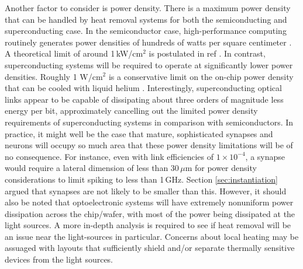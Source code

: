 \documentclass[twocolumn]{article}
\begin{document}
Another factor to consider is power density. There is a maximum power density that can be handled by heat removal systems for both the semiconducting and superconducting case. In the semiconductor case, high-performance computing routinely generates power densities of hundreds of watts per square centimeter \cite{tolpygo2016superconductor}. A theoretical limit of around 1\,kW/cm$^2$ is postulated in ref \cite{zhirnov2003limits}. In contrast, superconducting systems will be required to operate at significantly lower power densities. Roughly 1 W/cm$^2$ is a conservative limit on the on-chip power density that can be cooled with liquid helium \cite{tolpygo2016superconductor}. Interestingly, superconducting optical links appear to be capable of dissipating about three orders of magnitude less energy per bit, approximately cancelling out the limited power density requirements of superconducting systems in comparison with semiconductors. In practice, it might well be the case that mature, sophisticated synapses and neurons will occupy so much area that these power density limitations will be of no consequence. For instance, even with link efficiencies of $1 \times 10^{-4}$, a synapse would require a lateral dimension of less than 30\,$\mu$m for power density considerations to limit spiking to less than 1\,GHz. Section \ref{sec:instantiation} argued that synapses are not likely to be smaller than this. However, it should also be noted that optoelectronic systems will have extremely nonuniform power dissipation across the chip/wafer, with most of the power being dissipated at the light sources. A more in-depth analysis is required to see if heat removal will be an issue near the light-sources in particular. Concerns about local heating may be assuaged with layouts that sufficiently shield and/or separate thermally sensitive devices from the light sources.
\end{document}
